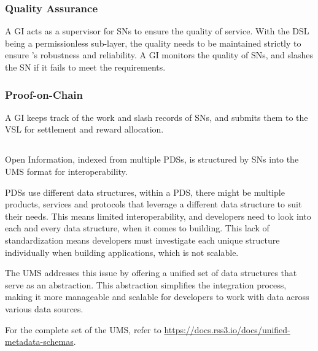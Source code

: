 \subsubsection{Quality Assurance} A GI acts as a supervisor for \glspl{SN} to ensure the quality of service. With the \gls{DSL} being a permissionless sub-layer, the quality needs to be maintained strictly to ensure 's robustness and reliability.
A \gls{GI} monitors the quality of \glspl{SN}, and slashes the \gls{SN} if it fails to meet the requirements.

\subsubsection{Proof-on-Chain} A GI keeps track of the work and slash records of \glspl{SN}, and submits them to the \gls{VSL} for settlement and reward allocation.

\subsection{}
\label{subsec:UMS}

Open Information, indexed from multiple \glspl{PDS}, is structured by \glspl{SN} into the \gls{UMS} format for interoperability.

\glspl{PDS} use different data structures, within a \gls{PDS}, there might be multiple products, services and protocols that leverage a different data structure to suit their needs. This means limited interoperability, and developers need to look into each and every data structure, when it comes to building. This lack of standardization means developers must investigate each unique structure individually when building applications, which is not scalable.

The \gls{UMS} addresses this issue by offering a unified set of data structures that serve as an abstraction. This abstraction simplifies the integration process, making it more manageable and scalable for developers to work with data across various data sources.

For the complete set of the \gls{UMS}, refer to \url{https://docs.rss3.io/docs/unified-metadata-schemas}.

